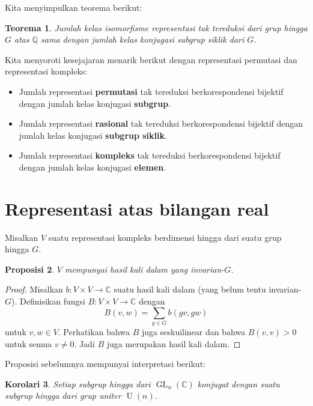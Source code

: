 \documentclass[12pt]{article}
\theoremstyle{plain}
\newtheorem{theorem}{Teorema}[section]
\newtheorem{proposition}[theorem]{Proposisi}
\newtheorem{corollary}[theorem]{Korolari}
\theoremstyle{definition}
\theoremstyle{remark}
\numberwithin{equation}{section}
\begin{document}
Kita menyimpulkan teorema berikut:

\begin{theorem}
Jumlah kelas isomorfisme representasi tak tereduksi dari
grup hingga $G$ atas $\mathbb{Q}$ sama dengan jumlah kelas konjugasi
subgrup siklik dari $G$.
\end{theorem}

Kita menyoroti kesejajaran menarik berikut dengan representasi
permutasi dan representasi kompleks:

\begin{itemize}
\item Jumlah representasi \textbf{permutasi} tak tereduksi berkorespondensi
bijektif dengan jumlah kelas konjugasi \textbf{subgrup}.
\item Jumlah representasi \textbf{rasional} tak tereduksi berkorespondensi
bijektif dengan jumlah kelas konjugasi \textbf{subgrup
siklik}.
\item Jumlah representasi \textbf{kompleks} tak tereduksi berkorespondensi
bijektif dengan jumlah kelas konjugasi \textbf{elemen}.
\end{itemize}

\section{Representasi atas bilangan real}

Misalkan $V$ suatu representasi kompleks berdimensi hingga
dari suatu grup hingga $G$.

\begin{proposition} \label{prop:Ginner}
$V$ mempunyai hasil kali dalam yang invarian-$G$.
\end{proposition}

\begin{proof}
Misalkan $b : V \times V \to \mathbb{C}$ suatu hasil kali dalam (yang belum tentu
invarian-$G$).
Definisikan fungsi $B : V \times V \to \mathbb{C}$ dengan
\[
B(v,w) = \sum_{g \in G}b(gv,gw)
\]
untuk $v, w \in V$.
Perhatikan bahwa $B$ juga seskuilinear
dan bahwa $B(v,v) > 0$ untuk semua $v \ne 0$.
Jadi $B$ juga merupakan hasil kali dalam.
\end{proof}

Proposisi sebelumnya mempunyai interpretasi berikut:

\begin{corollary}
Setiap subgrup hingga dari $\operatorname{GL}_n(\mathbb{C})$
konjugat dengan suatu subgrup hingga dari grup uniter
$\operatorname{U}(n)$.
\end{corollary}
\end{document}
